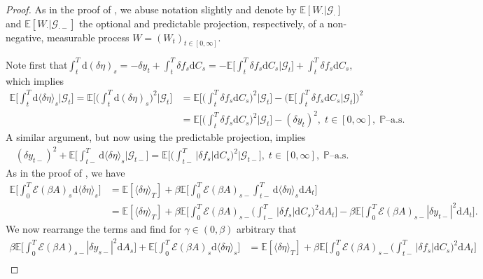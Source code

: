 \documentclass[10pt]{article} %
\newcommand\cE{\mathcal E}
\newcommand\cG{\mathcal G}
\def \E{\mathbb{E}}
\def \P{\mathbb{P}}
\def\d{\mathrm{d}}
\begin{document}
\begin{proof}
	As in the proof of , we abuse notation slightly and denote by $\E[W_\cdot| \cG_\cdot]$ and $\E[W_\cdot|\cG_{\cdot-}]$ the optional and predictable projection, respectively, of a non-negative, measurable process $W = (W_t)_{t \in [0,\infty]}$.
	
	\medskip
	Note first that$ \int_t^T \d(\delta\eta)_s = -\delta y_t + \int_t^T \delta f_s \d C_s = - \E\big[\int_t^T \delta f_s \d C_s \big| \cG_t\big] + \int_t^T \delta f_s \d C_s,$ which implies
	\begin{align}\label{eq::cond_delta_eta_bsde}
		\E\bigg[\int_t^T \d\langle\delta\eta\rangle_s\bigg|\cG_t\bigg] = \E\bigg[\bigg(\int_t^T \d(\delta\eta)_s\bigg)^2\bigg|\cG_t\bigg] &= \E\bigg[\bigg(\int_t^T \delta f_s \d C_s\bigg)^2 \bigg| \cG_t\bigg] - \bigg(\E\bigg[\int_t^T \delta f_s \d C_s \bigg| \cG_t\bigg]\bigg)^2 \nonumber\\
		&= \E\bigg[\bigg(\int_t^T \delta f_s \d C_s\bigg)^2 \bigg| \cG_t\bigg] - (\delta y_t)^2, \; t \in [0,\infty], \; \text{$\P$--a.s.}
	\end{align}
	A similar argument, but now using the predictable projection, implies
	\begin{align}\label{eq::cond_delta_eta_bsde_minus}
		(\delta y_{t-})^2 + \E\bigg[\int_{t-}^T \d\langle\delta\eta\rangle_s\bigg|\cG_{t-}\bigg] = \E\bigg[\bigg(\int_{t-}^T |\delta f_s| \d C_s\bigg)^2 \bigg| \cG_{t-}\bigg], \; t \in [0,\infty], \; \text{$\P$--a.s.}
	\end{align}
	As in the proof of , we have
	\begin{align*}
		\E\bigg[\int_0^T \cE(\beta A)_s \d \langle\delta\eta\rangle_s\bigg] 
		&= \E[\langle\delta\eta\rangle_T] + \beta \E\bigg[\int_0^T \cE(\beta A)_{s-}\int_{t-}^T \d\langle\delta\eta\rangle_s\d A_t\bigg] \\
		&= \E[\langle\delta\eta\rangle_T] + \beta \E\bigg[\int_0^T \cE(\beta A)_{s-}\bigg(\int_{t-}^T |\delta f_s|\d C_s\bigg)^2\d A_t\bigg] - \beta \E\bigg[\int_0^T \cE(\beta A)_{s-}|\delta y_{t-}|^2\d A_t\bigg].
	\end{align*}
	We now rearrange the terms and find for $\gamma \in (0,\beta)$ arbitrary that
	\begin{align*}
		\beta \E\bigg[\int_0^T \cE(\beta A)_{s-}|\delta y_{s-}|^2\d A_s\bigg] + \E\bigg[\int_0^T \cE(\beta A)_s \d \langle\delta\eta\rangle_s\bigg] 
		&= \E[\langle\delta\eta\rangle_T] + \beta \E\bigg[\int_0^T \cE(\beta A)_{s-}\bigg(\int_{t-}^T |\delta f_s|\d C_s\bigg)^2\d A_t\bigg] \\

\end{align*}
\end{proof}
\end{document}
